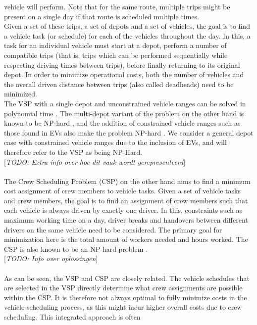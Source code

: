 \documentclass[ht]{article}
\newcommand{\todo}[1]{{\color{red}[\textit{TODO: #1}]}}
\begin{document}
vehicle will perform. Note that for the same route, multiple trips might be
present on a single day if that route is scheduled multiple times. \\ Given a
set of these trips, a set of depots and a set of vehicles, the goal is to find
a vehicle task (or schedule) for each of the vehicles throughout the day. In
this, a task for an individual vehicle must start at a depot, perform a number
of compatible trips (that is, trips which can be performed sequentially while
respecting driving times between trips), before finally returning to its
original depot. In order to minimize operational costs, both the number of
vehicles and the overall driven distance between trips (also called deadheads)
need to be minimized. \\ The VSP with a single depot and unconstrained vehicle
ranges can be solved in polynomial time \cite{Freling2003SDVSP}. The
multi-depot variant of the problem on the other hand is known to be NP-hard
\cite{Bodin1983, Bertossi1987, Even1975}, and the addition of constrained
vehicle ranges such as those found in EVs also make the problem NP-hard
\cite{Bodin1983, Sassi2014}. We consider a general depot case with constrained
vehicle ranges due to the inclusion of EVs, and will therefore refer to the VSP
as being NP-Hard. \\ \todo{Extra info over hoe dit vaak wordt gerepresenteerd}
\\\\ The Crew Scheduling Problem (CSP) on the other hand aims to find a minimum
cost assignment of crew members to vehicle tasks. Given a set of vehicle tasks
and crew members, the goal is to find an assignment of crew members such that
each vehicle is always driven by exactly one driver. In this, constraints such
as maximum working time on a day, driver breaks and handovers between different
drivers on the same vehicle need to be considered. The primary goal for
minimization here is the total amount of workers needed and hours worked. The
CSP is also known to be an NP-hard problem \cite{Fischetti1989}.\\ \todo{Info
  over oplossingen} \\\\ As can be seen, the VSP and CSP are closely related. The
vehicle schedules that are selected in the VSP directly determine what crew
assignments are possible within the CSP. It is therefore not always optimal to
fully minimize costs in the vehicle scheduling process, as this might incur
higher overall costs due to crew scheduling. This integrated approach is often
\end{document}
